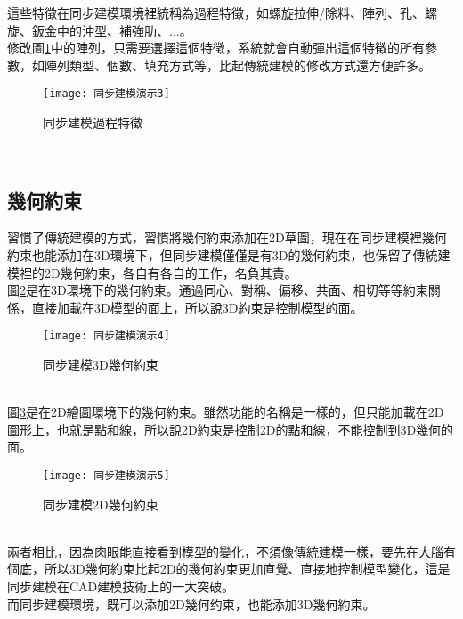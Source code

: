 這些特徵在同步建模環境裡統稱為過程特徵，如螺旋拉伸/除料、陣列、孔、螺旋、鈑金中的沖型、補強肋、...。\\

修改圖\ref{2.81}中的陣列，只需要選擇這個特徵，系統就會自動彈出這個特徵的所有參數，如陣列類型、個數、填充方式等，比起傳統建模的修改方式還方便許多。\\
\begin{figure}[hbt!]
\begin{center}
\texttt{[image: 同步建模演示3]}
\caption{\Large 同步建模過程特徵}\label{2.81}
\end{center}
\end{figure}
\\
\subsection{幾何約束}

習慣了傳統建模的方式，習慣將幾何約束添加在2D草圖，現在在同步建模裡幾何約束也能添加在3D環境下，但同步建模僅僅是有3D的幾何約束，也保留了傳統建模裡的2D幾何約束，各自有各自的工作，名負其責。\\

圖\ref{2.82}是在3D環境下的幾何約束。通過同心、對稱、偏移、共面、相切等等約束關係，直接加載在3D模型的面上，所以說3D約束是控制模型的面。\\
\begin{figure}[hbt!]
\begin{center}
\texttt{[image: 同步建模演示4]}
\caption{\Large 同步建模3D幾何約束}\label{2.82}
\end{center}
\end{figure}
\\
\qquad 圖\ref{2.83}是在2D繪圖環境下的幾何約束。雖然功能的名稱是一樣的，但只能加載在2D圖形上，也就是點和線，所以說2D約束是控制2D的點和線，不能控制到3D幾何的面。\\
\begin{figure}[hbt!]
\begin{center}
\texttt{[image: 同步建模演示5]}
\caption{\Large 同步建模2D幾何約束}\label{2.83}
\end{center}
\end{figure}
\\
\qquad 兩者相比，因為肉眼能直接看到模型的變化，不須像傳統建模一樣，要先在大腦有個底，所以3D幾何約束比起2D的幾何約束更加直覺、直接地控制模型變化，這是同步建模在CAD建模技術上的一大突破。\\
而同步建模環境，既可以添加2D幾何约束，也能添加3D幾何約束。\\

